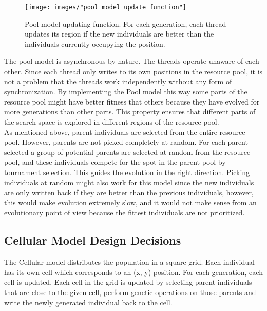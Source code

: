 \begin{figure}[h!]
\begin{center}
\texttt{[image: images/"pool model update function"]}
\caption{Pool model updating function. For each generation, each thread updates its region if the new individuals are better than the individuals currently occupying the position.}
\label{figure:pool model update function}
\end{center}
\end{figure}


\noindent The pool model is asynchronous by nature. The threads operate unaware of each other. Since each thread only writes to its own positions in the resource pool, it is not a problem that the threads work independently without any form of synchronization. By implementing the Pool model this way some parts of the resource pool might have better fitness that others because they have evolved for more generations than other parts. This property ensures that different parts of the search space is explored in different regions of the resource pool. \\


\noindent As mentioned above, parent individuals are selected from the entire resource pool. However, parents are not picked completely at random. For each parent selected a group of potential parents are selected at random from the resource pool, and these individuals compete for the spot in the parent pool by tournament selection. This guides the evolution in the right direction. Picking individuals at random might also work for this model since the new individuals are only written back if they are better than the previous individuals, however, this would make evolution extremely slow, and it would not make sense from an evolutionary point of view because the fittest individuals are not prioritized.


\subsection{Cellular Model Design Decisions}


\noindent The Cellular model distributes the population in a square grid. Each individual has its own cell which corresponds to an (x, y)-position. For each generation, each cell is updated. Each cell in the grid is updated by selecting parent individuals that are close to the given cell, perform genetic operations on those parents and write the newly generated individual back to the cell.\\


